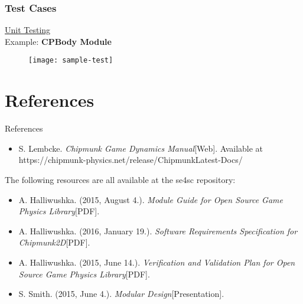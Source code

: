 \documentclass{beamer}
\begin{document}
\begin{frame}

\frametitle{Test Cases}

\underline{Unit Testing} \\
\vspace{5pt}
Example: \textbf{CPBody Module} 
\begin{figure}
\centering
\texttt{[image: sample-test]}
\label{fig:sample-test}
\end{figure}

\end{frame}


\section[References]{References}


\begin{frame}{References}
	\begin{itemize}
		\item S. Lembcke. \textit{Chipmunk Game Dynamics Manual}[Web]. Available at https://chipmunk-physics.net/release/ChipmunkLatest-Docs/
	\end{itemize}
	
	The following resources are all available at the se4sc repository:
	
	\begin{itemize}
		\item A. Halliwushka. (2015, August 4.). \textit{Module Guide for Open Source Game Physics Library}[PDF]. 
		\item A. Halliwushka. (2016, January 19.). \textit{Software Requirements Specification for Chipmunk2D}[PDF].
		\item A. Halliwushka. (2015, June 14.). \textit{Verification and Validation Plan for Open Source Game Physics Library}[PDF].
		\item S. Smith. (2015, June 4.). \textit{Modular Design}[Presentation].
	\end{itemize}
	
\end{frame}
\end{document}
